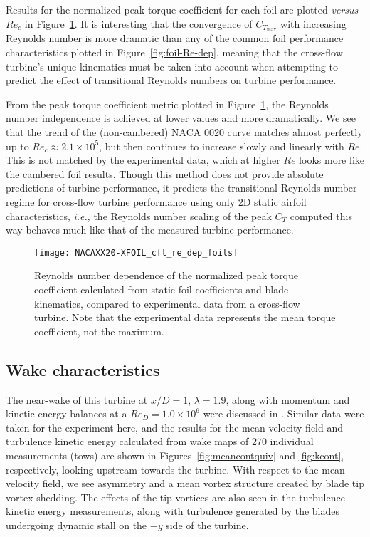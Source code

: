 Results for the normalized peak torque coefficient for each foil are plotted
\textit{versus} $Re_c$ in Figure~\ref{fig:foils-C_T-Re-dep}. It is interesting
that the convergence of $C_{T_\mathrm{max}}$ with increasing Reynolds number is
more dramatic than any of the common foil performance characteristics plotted in
Figure~\ref{fig:foil-Re-dep}, meaning that the cross-flow turbine's unique
kinematics must be taken into account when attempting to predict the effect of
transitional Reynolds numbers on turbine performance.

From the peak torque coefficient metric plotted in
Figure~\ref{fig:foils-C_T-Re-dep}, the Reynolds number independence is achieved
at lower values and more dramatically. We see that the trend of the
(non-cambered) NACA 0020 curve matches almost perfectly up to $Re_c \approx 2.1
\times 10^5$, but then continues to increase slowly and linearly with $Re$. This
is not matched by the experimental data, which at higher $Re$ looks more like
the cambered foil results. Though this method does not provide absolute
predictions of turbine performance, it predicts the transitional Reynolds number
regime for cross-flow turbine performance using only 2D static airfoil
characteristics, \emph{i.e.}, the Reynolds number scaling of the peak $C_T$
computed this way behaves much like that of the measured turbine performance.

\begin{figure}
    \centering
    
    \texttt{[image: NACAXX20-XFOIL\_cft\_re\_dep\_foils]}
    
    \caption{Reynolds number dependence of the normalized peak torque
        coefficient calculated from static foil coefficients and blade kinematics,
        compared to experimental data from a cross-flow turbine. Note that the
        experimental data represents the mean torque coefficient, not the maximum.}
    
    \label{fig:foils-C_T-Re-dep}
\end{figure}


\subsection{Wake characteristics}

The near-wake of this turbine at $x/D=1$, $\lambda=1.9$, along with momentum and
kinetic energy balances at a $Re_D = 1.0 \times 10^6$ were discussed in
\cite{Bachant2015-JoT}. Similar data were taken for the experiment here, and the
results for the mean velocity field and turbulence kinetic energy calculated
from wake maps of 270 individual measurements (tows) are shown in
Figures~\ref{fig:meancontquiv} and \ref{fig:kcont}, respectively, looking
upstream towards the turbine. With respect to the mean velocity field, we see
asymmetry and a mean vortex structure created by blade tip vortex shedding. The
effects of the tip vortices are also seen in the turbulence kinetic energy
measurements, along with turbulence generated by the blades undergoing dynamic
stall on the $-y$ side of the turbine.

